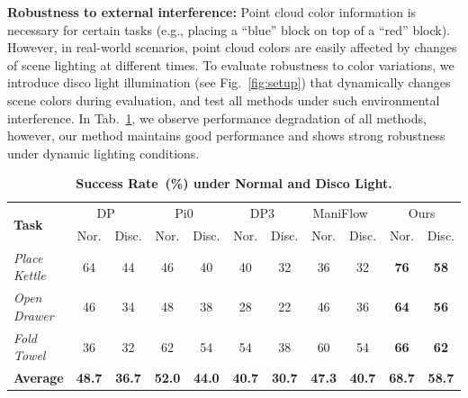 \documentclass[runningheads]{llncs}
\begin{document}
\textbf{Robustness to external interference:} Point cloud color information is necessary for certain tasks
(e.g., placing a ``blue'' block on top of a ``red'' block). However, in real-world scenarios, point cloud colors are easily affected by changes of scene lighting at different times. To evaluate robustness to color variations, we introduce disco
light illumination (see Fig.~\ref{fig:setup}) that dynamically changes scene colors during evaluation, and test all methods under such environmental interference. In Tab.~\ref{tab:disco_light}, we observe performance degradation of all methods, however, our method maintains good performance and shows strong robustness under dynamic lighting conditions. 
\begin{table}[]
\vspace{-1em}
    \centering
    \small
    \renewcommand{\arraystretch}{1.2}
    \setlength{\tabcolsep}{3.9pt} 
    \caption{\textbf{Success Rate~(\%) under Normal and Disco Light.}}
    \label{tab:disco_light}
    \begin{tabular}{lcccccccccc}
        \toprule
        \multirow{2}{*}{\textbf{Task}} & \multicolumn{2}{c}{DP~\cite{chi2024diffusionpolicyvisuomotorpolicy}} & \multicolumn{2}{c}{Pi0~\cite{black2024pi_0}} & \multicolumn{2}{c}{DP3~\cite{ze20243d}} & \multicolumn{2}{c}{ManiFlow~\cite{yan2025maniflowgeneralrobotmanipulation}} & \multicolumn{2}{c}{Ours} \\
        \cmidrule(lr){2-3} \cmidrule(lr){4-5} \cmidrule(lr){6-7} \cmidrule(lr){8-9} \cmidrule(lr){10-11}
        & Nor. & Disc. & Nor. & Disc. & Nor. & Disc. & Nor. & Disc. & Nor. & Disc. \\
        \midrule
        \textit{Place Kettle} & 64 & 44 & 46 & 40 & 40 & 32 & 36 & 32 & \cellcolor{colorNormal}\textbf{76} & \cellcolor{colorDisco}\textbf{58} \\
        \textit{Open Drawer}  & 46 & 34 & 48 & 38 & 28 & 22 & 46 & 36 & \cellcolor{colorNormal}\textbf{64} & \cellcolor{colorDisco}\textbf{56} \\
        \textit{Fold Towel}   & 36 & 32 & 62 & 54 & 54 & 38 & 60 & 54 & \cellcolor{colorNormal}\textbf{66} & \cellcolor{colorDisco}\textbf{62} \\
        \midrule
        \textbf{Average} & \textbf{48.7} & \textbf{36.7} & \textbf{52.0} & \textbf{44.0} & \textbf{40.7} & \textbf{30.7} & \textbf{47.3} & \textbf{40.7} & \cellcolor{colorNormal}\textbf{68.7} & \cellcolor{colorDisco}\textbf{58.7} \\
        \bottomrule
    \end{tabular}
\end{table}
\vspace{-2em}
\end{document}
